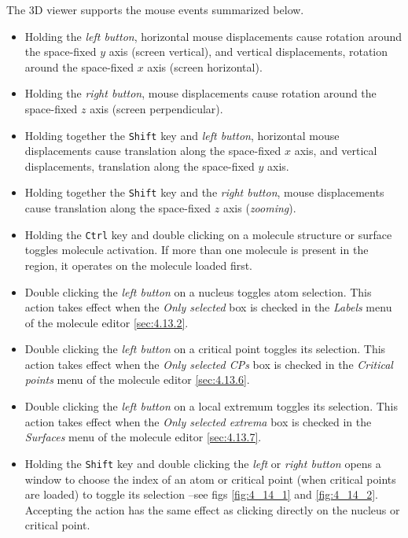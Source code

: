 \documentclass[10pt]{article}
\begin{document}
The 3D viewer supports the mouse events summarized below.
\begin{itemize}
\item Holding the {\it left button}, horizontal mouse displacements cause
rotation around the space-fixed $y$ axis (screen vertical), and vertical displacements, rotation
around the space-fixed $x$ axis (screen horizontal).
\item Holding the {\it right button}, mouse displacements cause
rotation around the space-fixed $z$ axis (screen perpendicular).
\item Holding together the \texttt{Shift} key and {\it left button}, horizontal
mouse displacements cause translation along the space-fixed $x$ axis, and
vertical displacements, translation along the space-fixed $y$ axis.
\item Holding together the \texttt{Shift} key and the {\it right button}, mouse
displacements cause translation along the space-fixed $z$ axis ({\it zooming}).
\item Holding the \texttt{Ctrl} key and double clicking on a molecule structure or surface toggles molecule activation. If more than one molecule is present in the region, it
operates on the molecule loaded first.
\item Double clicking the {\it left button} on a nucleus toggles atom selection. This action takes effect 
when the {\it Only selected} box is checked in the {\it Labels} menu of the molecule editor \ref{sec:4.13.2}.
\item Double clicking the {\it left button} on a critical 
point
toggles its selection. This action takes effect 
when the {\it Only selected CPs} box is checked in the {\it Critical points} menu of the molecule editor \ref{sec:4.13.6}.
\item Double clicking the {\it left button} on a local extremum toggles its selection. This action takes effect 
when the {\it Only selected extrema} box is checked in the {\it Surfaces} menu of the molecule editor \ref{sec:4.13.7}.
\item Holding the \texttt{Shift} key and double clicking the {\it left} or 
{\it right button}
opens a window to choose the index of an atom or critical point (when critical points are loaded) 
to toggle its selection --see figs \ref{fig:4_14_1} and \ref{fig:4_14_2}.
Accepting the action has the same effect as clicking directly on the nucleus or critical point.
\end{itemize}
\end{document}
